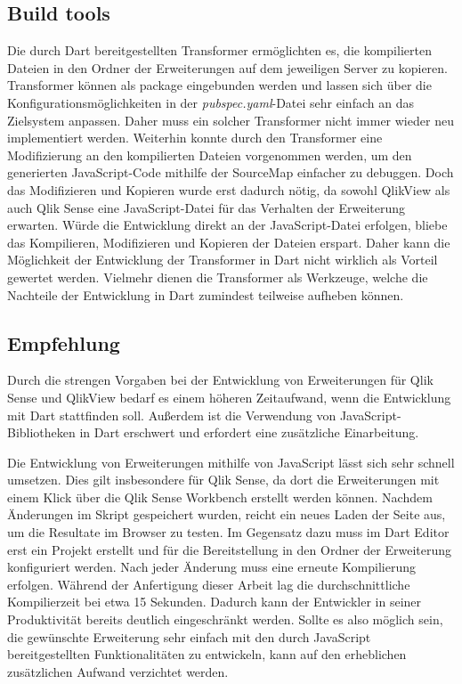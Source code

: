 \subsection{Build tools}

Die durch Dart bereitgestellten Transformer ermöglichten es, die kompilierten Dateien in den Ordner der Erweiterungen auf dem jeweiligen Server zu kopieren. Transformer können als package eingebunden werden und lassen sich über die Konfigurations\-möglich\-keiten in der \textit{pubspec.yaml}-Datei sehr einfach an das Zielsystem anpassen. Daher muss ein solcher Transformer nicht immer wieder neu implementiert werden. Weiterhin konnte durch den Transformer eine Modifizierung an den kompilierten Dateien vorgenommen werden, um den generierten JavaScript-Code mithilfe der SourceMap einfacher zu debuggen. Doch das Modifizieren und Kopieren wurde erst dadurch nötig, da sowohl QlikView als auch Qlik Sense eine JavaScript-Datei für das Verhalten der Erweiterung erwarten. Würde die Entwicklung direkt an der JavaScript-Datei erfolgen, bliebe das Kompilieren, Modifizieren und Kopieren der Dateien erspart. Daher kann die Möglich\-keit der Entwicklung der Transformer in Dart nicht wirklich als Vorteil gewertet werden. Vielmehr dienen die Transformer als Werkzeuge, welche die Nachteile der Entwicklung in Dart zumindest teilweise aufheben können.

\newpage

\subsection{Empfehlung}


Durch die strengen Vorgaben bei der Entwicklung von Erweiterungen für Qlik Sense und QlikView bedarf es einem höheren Zeitaufwand, wenn die Entwicklung mit Dart stattfinden soll. Außerdem ist die Verwendung von JavaScript-Bibliotheken in Dart erschwert und erfordert eine zusätzliche Einarbeitung.

Die Entwicklung von Erweiterungen mithilfe von JavaScript lässt sich sehr schnell umsetzen. Dies gilt insbesondere für Qlik Sense, da dort die Erweiterungen mit einem Klick über die Qlik Sense Workbench erstellt werden können. Nachdem Änderungen im Skript gespeichert wurden, reicht ein neues Laden der Seite aus, um die Resultate im Browser zu testen. Im Gegensatz dazu muss im Dart Editor erst ein Projekt erstellt und für die Bereitstellung in den Ordner der Erweiterung konfiguriert werden. Nach jeder Änderung muss eine erneute Kompilierung erfolgen. Während der Anfertigung dieser Arbeit lag die durchschnittliche Kompilierzeit bei etwa 15 Sekunden. Dadurch kann der Entwickler in seiner Produktivität bereits deutlich eingeschränkt werden. Sollte es also möglich sein, die gewünschte Erweiterung sehr einfach mit den durch JavaScript bereitgestellten Funktionalitäten zu entwickeln, kann auf den erheblichen zusätzlichen Aufwand verzichtet werden.

